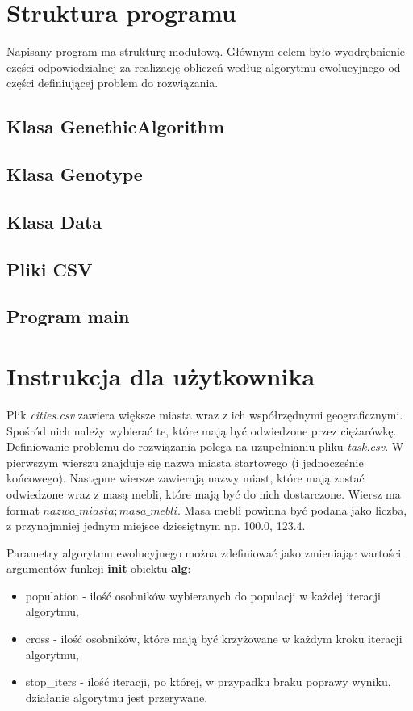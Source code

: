 \documentclass[12pt, oneside, final]{report}
\begin{document}
\section{Struktura programu}
Napisany program ma strukturę modułową. Głównym celem było wyodrębnienie części odpowiedzialnej za realizację obliczeń według algorytmu ewolucyjnego od części definiującej problem do rozwiązania.

\subsection{Klasa GenethicAlgorithm}
\subsection{Klasa Genotype}
\subsection{Klasa Data}
\subsection{Pliki CSV}
\subsection{Program main}

\section{Instrukcja dla użytkownika}
Plik \textit{cities.csv} zawiera większe miasta wraz z ich współrzędnymi geograficznymi. Spośród nich należy wybierać te, które mają być odwiedzone przez ciężarówkę. Definiowanie problemu do rozwiązania polega na uzupełnianiu pliku \textit{task.csv}. W pierwszym wierszu znajduje się nazwa miasta startowego (i jednocześnie końcowego). Następne wiersze zawierają nazwy miast, które mają zostać odwiedzone wraz z masą mebli, które mają być do nich dostarczone. Wiersz ma format $nazwa\_miasta;masa\_mebli$. Masa mebli powinna być podana jako liczba, z przynajmniej jednym miejsce dziesiętnym np. 100.0, 123.4.

Parametry algorytmu ewolucyjnego można zdefiniować jako zmieniając wartości argumentów funkcji \textbf{init} obiektu \textbf{alg}:
\begin{itemize}
\item population - ilość osobników wybieranych do populacji w każdej iteracji algorytmu,
\item cross - ilość osobników, które mają być krzyżowane w każdym kroku iteracji algorytmu,
\item stop\_iters - ilość iteracji, po której, w przypadku braku poprawy wyniku, działanie algorytmu jest przerywane.
\end{itemize}
\end{document}
